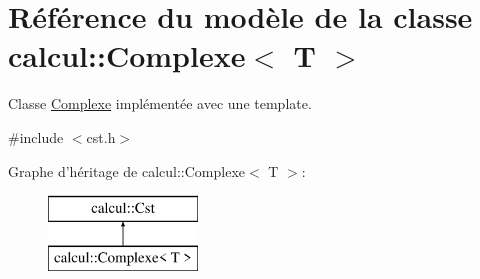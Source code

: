 \hypertarget{classcalcul_1_1_complexe}{\section{Référence du modèle de la classe calcul\-:\-:Complexe$<$ T $>$}
\label{classcalcul_1_1_complexe}
}


Classe \hyperlink{classcalcul_1_1_complexe}{Complexe} implémentée avec une template.  




{\ttfamily \#include $<$cst.\-h$>$}

Graphe d'héritage de calcul\-:\-:Complexe$<$ T $>$\-:\begin{figure}[H]
\begin{center}
\leavevmode
\includegraphics[height=2.000000cm]{classcalcul_1_1_complexe}
\end{center}
\end{figure}
